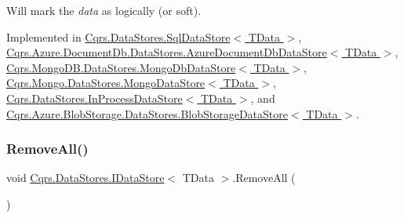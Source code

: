 Will mark the {\itshape data}  as logically (or soft). 



Implemented in \hyperlink{classCqrs_1_1DataStores_1_1SqlDataStore_a898d15db199f054865a96ac646bf54fb_a898d15db199f054865a96ac646bf54fb}{Cqrs.\+Data\+Stores.\+Sql\+Data\+Store$<$ T\+Data $>$}, \hyperlink{classCqrs_1_1Azure_1_1DocumentDb_1_1DataStores_1_1AzureDocumentDbDataStore_abf9bcf75e8e0e1ec86155bf4da1a7b7a_abf9bcf75e8e0e1ec86155bf4da1a7b7a}{Cqrs.\+Azure.\+Document\+Db.\+Data\+Stores.\+Azure\+Document\+Db\+Data\+Store$<$ T\+Data $>$}, \hyperlink{classCqrs_1_1MongoDB_1_1DataStores_1_1MongoDbDataStore_a14b43546e8d1e1832358e1cf2f8535f1_a14b43546e8d1e1832358e1cf2f8535f1}{Cqrs.\+Mongo\+D\+B.\+Data\+Stores.\+Mongo\+Db\+Data\+Store$<$ T\+Data $>$}, \hyperlink{classCqrs_1_1Mongo_1_1DataStores_1_1MongoDataStore_a64003d01de3ac6ffd0e41bb7f572bf96_a64003d01de3ac6ffd0e41bb7f572bf96}{Cqrs.\+Mongo.\+Data\+Stores.\+Mongo\+Data\+Store$<$ T\+Data $>$}, \hyperlink{classCqrs_1_1DataStores_1_1InProcessDataStore_a43a93c614a403181e0641106ca9509d6_a43a93c614a403181e0641106ca9509d6}{Cqrs.\+Data\+Stores.\+In\+Process\+Data\+Store$<$ T\+Data $>$}, and \hyperlink{classCqrs_1_1Azure_1_1BlobStorage_1_1DataStores_1_1BlobStorageDataStore_af054d4134671d66981c4d91df5c1d481_af054d4134671d66981c4d91df5c1d481}{Cqrs.\+Azure.\+Blob\+Storage.\+Data\+Stores.\+Blob\+Storage\+Data\+Store$<$ T\+Data $>$}.

\mbox{\label{interfaceCqrs_1_1DataStores_1_1IDataStore_aead8d7a39a717d29af05daf7b64bea94_aead8d7a39a717d29af05daf7b64bea94}} 
\subsubsection{\texorpdfstring{Remove\+All()}{RemoveAll()}}
{\footnotesize\ttfamily void \hyperlink{interfaceCqrs_1_1DataStores_1_1IDataStore}{Cqrs.\+Data\+Stores.\+I\+Data\+Store}$<$ T\+Data $>$.Remove\+All (\begin{DoxyParamCaption}{ }\end{DoxyParamCaption})}



